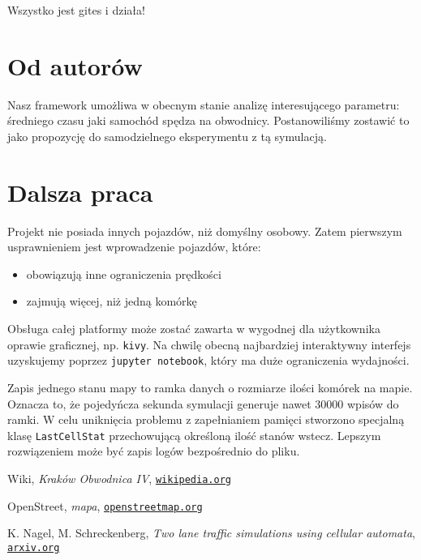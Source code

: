 \documentclass[a4paper,12pt]{article}
\begin{document}
	Wszystko jest gites i działa!
		
    \section{Od autorów}
    Nasz framework umożliwa w obecnym stanie analizę interesującego parametru: średniego czasu jaki samochód spędza na obwodnicy. Postanowiliśmy zostawić to jako propozycję do samodzielnego eksperymentu z tą symulacją.

    \section{Dalsza praca}
    Projekt nie posiada innych pojazdów, niż domyślny osobowy. Zatem pierwszym usprawnieniem jest wprowadzenie pojazdów, które: 
    
    \begin{itemize}
    	\item obowiązują inne ograniczenia prędkości
    	\item zajmują więcej, niż jedną komórkę
    \end{itemize}

	Obsługa całej platformy może zostać zawarta w wygodnej dla użytkownika oprawie graficznej, np. \texttt{kivy}. Na chwilę obecną najbardziej interaktywny interfejs uzyskujemy poprzez \texttt{jupyter notebook}, który ma duże ograniczenia wydajności.
	
	Zapis jednego stanu mapy to ramka danych o rozmiarze ilości komórek na mapie. Oznacza to, że pojedyńcza sekunda symulacji generuje nawet 30000 wpisów do ramki. W celu uniknięcia problemu z zapełnianiem pamięci stworzono specjalną klasę \texttt{LastCellStat} przechowującą określoną ilość stanów wstecz.
	Lepszym rozwiązeniem może być zapis logów bezpośrednio do pliku.

	\pagebreak
	\begin{thebibliography}{15}
		Wiki, \textit{Kraków Obwodnica IV},
		\texttt{\href{https://pl.wikipedia.org/wiki/Obwodnice_Krakowa\#IV_obwodnica}{wikipedia.org}}
		
		OpenStreet, \textit{mapa},
		\texttt{\href{https://www.openstreetmap.org/}{openstreetmap.org}}
		
		K. Nagel, M. Schreckenberg, \textit{Two lane traffic simulations using cellular automata},
		\texttt{\href{https://arxiv.org/pdf/cond-mat/9512119.pdf}{arxiv.org}}
	\end{thebibliography}
	
\end{document}
